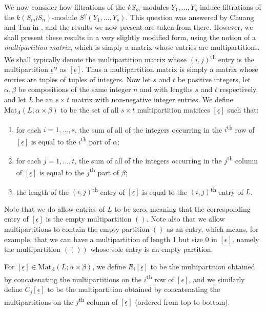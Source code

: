 \documentclass[10pt]{article}
\theoremstyle{definition}
\newcommand{\tss}[1]{\textsuperscript{#1}}
\newcommand{\ul}[1]{\underline{#1}}
\begin{document}
We now consider how filtrations of the $kS_m$-modules $Y_1,\ldots,Y_s$ induce filtrations of the $k(S_m \wr S_n)$-module
$S^{\ul{\eta}}(Y_1,\ldots,Y_s)$. This question was answered by Chuang and Tan
in \cite{CHTAN}, and the results we now present are taken from there. However, we shall present these results in a very slightly modified
form, using the notion of a \textit{multipartition matrix}, which is simply a matrix whose entries are multipartitions. We shall typically
denote the multipartition matrix whose $(i,j)$\tss{th} entry is the multipartition $\ul{\epsilon}^{ij}$ as $[\ul{\epsilon}]$. Thus a
multipartition matrix is simply a matrix whose entries are tuples of tuples of integers. Now let $s$ and $t$ be positive integers,
let $\alpha,\beta$ be compositions of the same integer $n$ and with lengths $s$ and $t$ respectively, and let $L$ be an $s{\times}t$
matrix with non-negative integer entries. We define $\mathrm{Mat}_{\ul{\Lambda}}(L;\alpha{\times}\beta)$ to be the
set of all $s{\times}t$ multipartition matrices $[\ul{\epsilon}]$ such that:
\begin{enumerate}
\item for each $i=1,\ldots,s$, the sum of all of the integers occurring in the $i$\tss{th} row of $[\ul{\epsilon}]$ is equal to the
$i$\tss{th} part of $\alpha$;
\item for each $j=1,\ldots,t$, the sum of all of the integers occurring in the $j$\tss{th} column of $[\ul{\epsilon}]$ is equal to the
$j$\tss{th} part of $\beta$;
\item the length of the $(i,j)$\tss{th} entry of $[\ul{\epsilon}]$ is equal to the $(i,j)$\tss{th} entry of $L$.
\end{enumerate}
Note that we do allow entries of $L$ to be zero, meaning that the corresponding entry of $[\ul{\epsilon}]$ is the empty multipartition
$()$. Note also that we allow multipartitions to contain the empty partition $()$ as an entry, which means, for example, that we can have
a multipartition of length 1 but size 0 in $[\ul{\epsilon}]$, namely the multipartition $(())$ whose sole entry is an empty partition.

For $[\ul{\epsilon}] \in \mathrm{Mat}_{\ul{\Lambda}}(L;\alpha{\times}\beta)$, we define $R_i[\ul{\epsilon}]$ to be the multipartition
obtained by concatenating the multipartitions on the $i$\tss{th} row of $[\ul{\epsilon}]$, and we similarly define $C_j[\ul{\epsilon}]$
to be the multipartition obtained by concatenating the multipartitions on the $j$\tss{th} column of $[\ul{\epsilon}]$ (ordered from top
to bottom).
\end{document}
